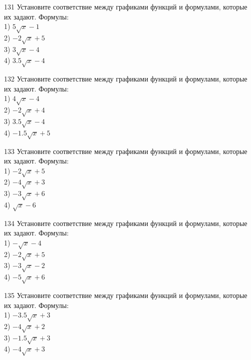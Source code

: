 \documentclass[4apaper]{article}
\begin{document}
\begin{taskBN}{131}
Установите соответствие между графиками функций и формулами, которые их задают. Формулы: \\1) $5\sqrt{x}-1$\\2) $-2\sqrt{x}+5$\\3) $3\sqrt{x}-4$\\4) $3.5\sqrt{x}-4$
\end{taskBN}

\begin{taskBN}{132}
Установите соответствие между графиками функций и формулами, которые их задают. Формулы: \\1) $4\sqrt{x}-4$\\2) $-2\sqrt{x}+4$\\3) $3.5\sqrt{x}-4$\\4) $-1.5\sqrt{x}+5$
\end{taskBN}

\begin{taskBN}{133}
Установите соответствие между графиками функций и формулами, которые их задают. Формулы: \\1) $-2\sqrt{x}+5$\\2) $-4\sqrt{x}+3$\\3) $-3\sqrt{x}+6$\\4) $\sqrt{x}-6$
\end{taskBN}

\begin{taskBN}{134}
Установите соответствие между графиками функций и формулами, которые их задают. Формулы: \\1) $-\sqrt{x}-4$\\2) $-2\sqrt{x}+5$\\3) $-3\sqrt{x}-2$\\4) $-5\sqrt{x}+6$
\end{taskBN}

\begin{taskBN}{135}
Установите соответствие между графиками функций и формулами, которые их задают. Формулы: \\1) $-3.5\sqrt{x}+3$\\2) $-4\sqrt{x}+2$\\3) $-1.5\sqrt{x}+3$\\4) $-4\sqrt{x}+3$
\end{taskBN}
\end{document}
